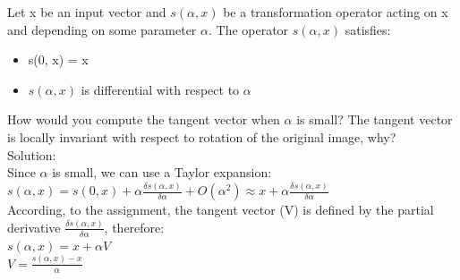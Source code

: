 \documentclass[a4paper, 12pt]{article}
\begin{document}
Let x be an input vector and $s(\alpha, x)$ be a transformation operator acting on x and depending on some parameter $\alpha$. The operator $s(\alpha, x)$ satisfies:
\begin{itemize}
\item s(0, x) = x
\item $s(\alpha, x)$ is differential with respect to $\alpha$
\end{itemize}
How would you compute the tangent vector when $\alpha$ is small? The tangent vector is locally invariant with respect to rotation of the original image, why?\\

Solution:\\

Since $\alpha$ is small, we can use a Taylor expansion: $s(\alpha, x) = s(0, x) + \alpha \frac{\delta s(\alpha, x)}{\delta \alpha} + O(\alpha^2) \approx x + \alpha \frac{\delta s(\alpha, x)}{\delta \alpha}$\\

According, to the assignment, the tangent vector (V) is defined by the partial derivative $\frac{\delta s(\alpha, x)}{\delta \alpha}$, therefore:\\

$s(\alpha, x) =  x + \alpha V$\\

$V = \frac{s(\alpha, x) -  x}{\alpha}$\\
\end{document}
